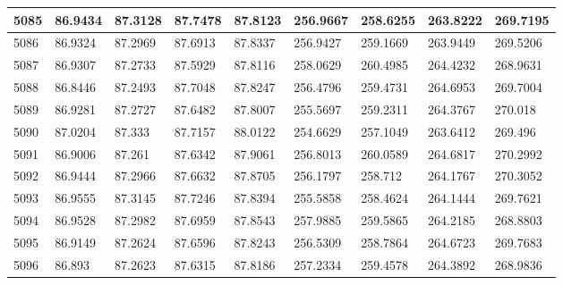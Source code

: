 \documentclass[a4paper,11pt]{article}
\begin{document}
\begin{tabularx}{\textwidth}{|l|X|X|X|X|X|X|X|X|}
5085 & 86.9434 & 87.3128 & 87.7478 & 87.8123 & 256.9667 & 258.6255 & 263.8222 & 269.7195 \\ \hline
5086 & 86.9324 & 87.2969 & 87.6913 & 87.8337 & 256.9427 & 259.1669 & 263.9449 & 269.5206 \\ \hline
5087 & 86.9307 & 87.2733 & 87.5929 & 87.8116 & 258.0629 & 260.4985 & 264.4232 & 268.9631 \\ \hline
5088 & 86.8446 & 87.2493 & 87.7048 & 87.8247 & 256.4796 & 259.4731 & 264.6953 & 269.7004 \\ \hline
5089 & 86.9281 & 87.2727 & 87.6482 & 87.8007 & 255.5697 & 259.2311 & 264.3767 & 270.018 \\ \hline
5090 & 87.0204 & 87.333 & 87.7157 & 88.0122 & 254.6629 & 257.1049 & 263.6412 & 269.496 \\ \hline
5091 & 86.9006 & 87.261 & 87.6342 & 87.9061 & 256.8013 & 260.0589 & 264.6817 & 270.2992 \\ \hline
5092 & 86.9444 & 87.2966 & 87.6632 & 87.8705 & 256.1797 & 258.712 & 264.1767 & 270.3052 \\ \hline
5093 & 86.9555 & 87.3145 & 87.7246 & 87.8394 & 255.5858 & 258.4624 & 264.1444 & 269.7621 \\ \hline
5094 & 86.9528 & 87.2982 & 87.6959 & 87.8543 & 257.9885 & 259.5865 & 264.2185 & 268.8803 \\ \hline
5095 & 86.9149 & 87.2624 & 87.6596 & 87.8243 & 256.5309 & 258.7864 & 264.6723 & 269.7683 \\ \hline
5096 & 86.893 & 87.2623 & 87.6315 & 87.8186 & 257.2334 & 259.4578 & 264.3892 & 268.9836 \\ \hline
\end{tabularx}
\end{document}
